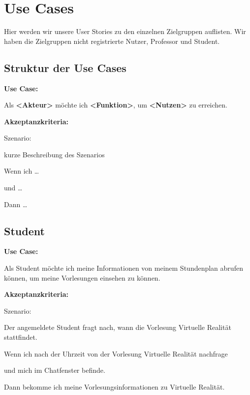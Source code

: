\section{Use Cases}
Hier werden wir unsere User Stories zu den einzelnen Zielgruppen auflisten.
Wir haben die Zielgruppen nicht registrierte Nutzer, Professor und Student.

\subsection{Struktur der Use Cases}
\textbf{Use Case:}
\newline

\noindent Als \textbf{<Akteur>} möchte ich \textbf{<Funktion>}, um \textbf{<Nutzen>} zu erreichen.
\newline

\noindent \textbf{Akzeptanzkriteria:}
\newline

\noindent Szenario: 

\noindent kurze Beschreibung des Szenarios
\newline

\noindent Wenn ich \dots

\noindent und \dots

\noindent Dann \dots

\subsection{Student}

\textbf{Use Case:}
\newline

\noindent Als Student möchte ich meine Informationen von meinem Stundenplan abrufen können,
um meine Vorlesungen einsehen zu können.
\newline

\noindent \textbf{Akzeptanzkriteria:}
\newline

\noindent Szenario: 

\noindent Der angemeldete Student fragt nach, wann die Vorlesung Virtuelle Realität stattfindet.
\newline

\noindent Wenn ich nach der Uhrzeit von der Vorlesung Virtuelle Realität nachfrage

\noindent und mich im Chatfenster befinde.

\noindent Dann bekomme ich meine Vorlesungsinformationen zu Virtuelle Realität.

